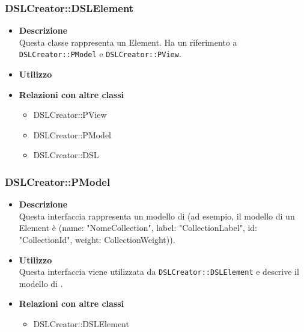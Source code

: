         \subsubsection{DSLCreator::DSLElement}
        \begin{itemize}
        \item \textbf{Descrizione} \hfill \\
          Questa classe rappresenta un  Element. Ha un riferimento a \texttt{DSLCreator::PModel} e \texttt{DSLCreator::PView}.
        \item \textbf{Utilizzo}  \hfill \\
        \item \textbf{Relazioni con altre classi} \hfill 
          \begin{itemize}
          \item DSLCreator::PView
          \item DSLCreator::PModel
          \item DSLCreator::DSL
          \end{itemize}
        \end{itemize}

        \subsubsection{DSLCreator::PModel}
        \begin{itemize}
        \item \textbf{Descrizione} \hfill \\
          Questa interfaccia rappresenta un modello di  (ad esempio, il modello  di un  Element \`{e} (name: "NomeCollection", label: "CollectionLabel", id: "CollectionId", weight: CollectionWeight)).
        \item \textbf{Utilizzo}  \hfill \\
          Questa interfaccia viene utilizzata da \texttt{DSLCreator::DSLElement} e descrive il modello di .
        \item \textbf{Relazioni con altre classi} \hfill 
          \begin{itemize}
          \item DSLCreator::DSLElement
          \end{itemize}
        \end{itemize}

